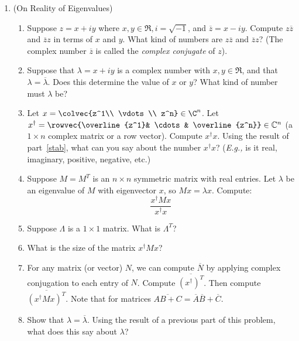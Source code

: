 


\begin{enumerate}
\item\label{prob_real_eigenvalues} (On Reality of Eigenvalues) \begin{enumerate}
\item\label{stab}
Suppose $z=x+iy$ where $x,y \in \Re, i=\sqrt{-1}$, and $\overline{z}=x-iy$. Compute $z\overline{z}$ and $\overline{z}z$ in terms of \(x\) and \(y\). What kind of numbers are \(z \overline{z}\) and \(\overline{z}z\)? (The complex number \(\overline{z}\) is called the \emph{complex conjugate} of \(z\)).

\item Suppose that \(\lambda=x+iy\) is a complex number with \(x,y \in \Re\), and that $\lambda=\overline{\lambda}$. Does this determine the value of \(x\) or \(y\)? What kind of number must \(\lambda\) be?

\item Let $x=\colvec{z^1\\ \vdots \\ z^n}\in \C^n$.  Let $x^\dagger=\rowvec{\overline{z^1}& \cdots & \overline{z^n}} \in \mathbb{C}^n$ (a $1 \times n$ complex matrix or a row vector).  Compute $x^\dagger x$.  Using the result of part~\ref{stab}, what can you say about the number $x^\dagger x$? ({\itshape E.g.,} is it real, imaginary, positive, negative, etc.)

\item Suppose $M=M^T$ is an $n\times n$ symmetric matrix with real entries.  Let $\lambda$ be an eigenvalue of $M$ with eigenvector $x$, so $Mx=\lambda x$. Compute:
\[
\frac{x^\dagger Mx}{x^\dagger x}
\]

\item Suppose $\Lambda$ is a $1\times 1$ matrix.  What is $\Lambda^T$?

\item What is the size of the matrix $x^\dagger Mx$?

\item For any matrix (or vector) $N$, we can compute $\overline{N}$ by applying complex conjugation to each entry of $N$.
Compute $\overline{(x^\dagger)^T}$.  
Then compute $\overline{(x^\dagger M x)^T}$.
Note that for matrices $\overline{AB + C} = \overline{A} \overline{B} + \overline{C}$.

\item Show that $\lambda=\overline{\lambda}$.  Using the result of a previous part of this problem, what does this say about $\lambda$?
\end{enumerate}


\end{enumerate}
